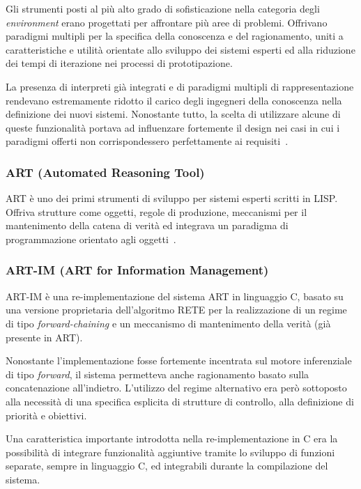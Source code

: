 Gli strumenti posti al più alto grado di sofisticazione nella categoria degli \emph{environment} erano progettati per affrontare più aree di problemi. Offrivano paradigmi multipli per la specifica della conoscenza e del ragionamento, uniti a caratteristiche e utilità orientate allo sviluppo dei sistemi esperti ed alla riduzione dei tempi di iterazione nei processi di prototipazione. 

La presenza di interpreti già integrati e di paradigmi multipli di rappresentazione rendevano estremamente ridotto il carico degli ingegneri della conoscenza nella definizione dei nuovi sistemi. Nonostante tutto, la scelta di utilizzare alcune di queste funzionalità portava ad influenzare fortemente il design nei casi in cui i paradigmi offerti non corrispondessero perfettamente ai requisiti~\cite{development1993}.

\subsubsection[ART]{ART (Automated Reasoning Tool)}
ART è uno dei primi strumenti di sviluppo per sistemi esperti scritti in LISP. Offriva strutture come oggetti, regole di produzione, meccanismi per il mantenimento della catena di verità ed integrava un paradigma di programmazione orientato agli oggetti~\cite{art1998}.

\subsubsection[ART-IM]{ART-IM (ART for Information Management)}
ART-IM è una re-implementazione del sistema ART in linguaggio C, basato su una versione proprietaria dell'algoritmo RETE per la realizzazione di un regime di tipo \emph{forward-chaining} e un meccanismo di mantenimento della verità (già presente in ART).

Nonostante l'implementazione fosse fortemente incentrata sul motore inferenziale di tipo \emph{forward}, il sistema permetteva anche ragionamento basato sulla concatenazione all'indietro. L'utilizzo del regime alternativo era però sottoposto alla necessità di una specifica esplicita di strutture di controllo, alla definizione di priorità e obiettivi.

Una caratteristica importante introdotta nella re-implementazione in C era la possibilità di integrare funzionalità aggiuntive tramite lo sviluppo di funzioni separate, sempre in linguaggio C, ed integrabili durante la compilazione del sistema.

